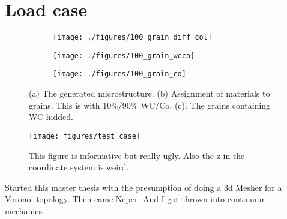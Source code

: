 \documentclass[load_case.tex]{subfiles}
\begin{document}
\chapter{Load case}



\begin{figure}
\centering
\begin{subfigure}[b]{.5\textwidth}
  \centering
  \texttt{[image: ./figures/100\_grain\_diff\_col]}
  \caption{}
  \label{fig:cowc_a}
\end{subfigure}%
\hspace{-10mm}
\begin{subfigure}[b]{.5\textwidth}
  \centering
  \texttt{[image: ./figures/100\_grain\_wcco]}
  \caption{}
  \label{fig:cowc_b}
\end{subfigure}%
\hspace{-10mm}
\begin{subfigure}[b]{.5\textwidth}
  \centering
  \texttt{[image: ./figures/100\_grain\_co]}
  \caption{}
  \label{fig:cowc_c}
\end{subfigure}
\caption{(a) The generated microstructure. (b) Assignment of materials to grains. This is with 10\%/90\% WC/Co. (c). The grains containing WC hidded.}
\label{fig:cohs_2}
\end{figure}





\begin{figure}[ht]
\centering
\texttt{[image: figures/test\_case]}
\caption{This figure is informative but really ugly. Also the z in the coordinate system is weird.}
\label{fig:test_case}
\end{figure}


Started this master thesis with the presumption of doing a 3d Mesher for a Voronoi topology. Then came Neper. And I got thrown into continuum mechanics.
\end{document}
